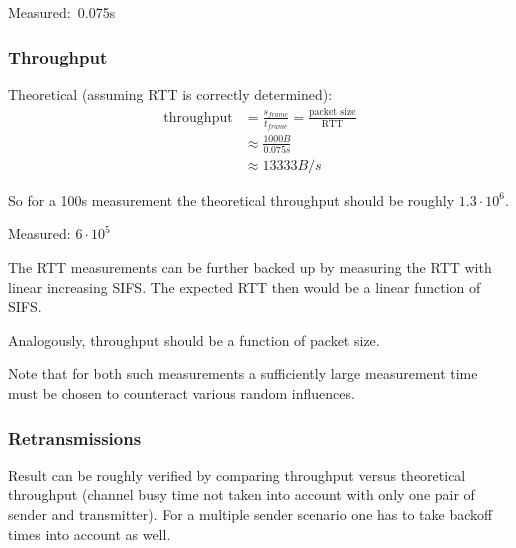 \documentclass{article}
\begin{document}
\bigskip

Measured:~0.075s 

\subsubsection{Throughput}

\bigskip

Theoretical (assuming RTT is correctly determined):
\begin{equation*}
\begin{split}
	\text{throughput} & = \frac{s_{frame}}{t_{frame}} = \frac{\text{packet size}}{\text{RTT}} \\
	& \approx \frac{1000B}{0.075s} \\
	& \approx 13333B/s
\end{split}
\end{equation*}

So for a 100s measurement the theoretical throughput should be roughly $1.3\cdot 10^6$.

Measured: $6 \cdot 10^5$

\bigskip
The RTT measurements can be further backed up by measuring the RTT with linear increasing SIFS. The expected RTT then would be a linear function of SIFS.

\bigskip

Analogously, throughput should be a function of packet size. 

\bigskip

Note that for both such measurements a sufficiently large measurement time must be chosen to counteract various random influences.

\subsubsection{Retransmissions}
Result can be roughly verified by comparing throughput versus theoretical throughput (channel busy time not taken into account with only one pair of sender and transmitter). For a multiple sender scenario one has to take backoff times into account as well.
\end{document}
